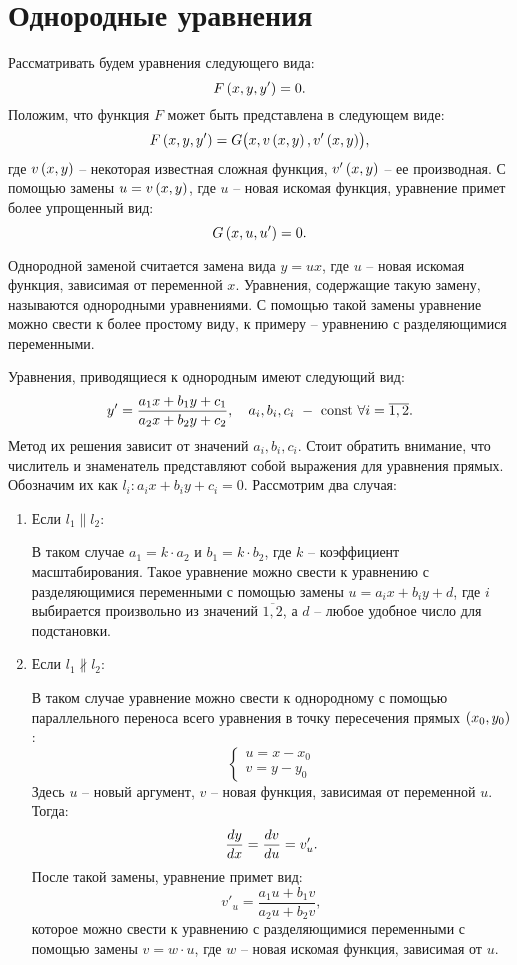 \section{Однородные уравнения}
	
	Рассматривать будем уравнения следующего вида:
	\[ F \left( x, y, y' \right) = 0. \]
	Положим, что функция $F$ может быть представлена в следующем виде:
	\[ F \left( x, y, y' \right) = G \bigl( x, v\left( x, y \right), v'\left( x, y \right) \bigr), \]
	где $v \left( x, y \right)$ -- некоторая известная сложная функция, $v' \left( x, y \right)$ -- ее производная. С помощью замены $u = v \left( x, y \right)$, где $u$ -- новая искомая функция, уравнение примет более упрощенный вид:
	\[ G \left( x, u, u' \right) = 0. \]

	Однородной заменой считается замена вида $y = ux$, где $u$ -- новая искомая функция, зависимая от переменной $x$. Уравнения, содержащие такую замену, называются однородными уравнениями. С помощью такой замены уравнение можно свести к более простому виду, к примеру -- уравнению с разделяющимися переменными.

	Уравнения, приводящиеся к однородным имеют следующий вид:
	\[ y' = \frac{a_1 x + b_1 y + c_1}{a_2 x + b_2 y + c_2}, \quad a_i, b_i, c_i ~ - ~ \mathrm{const} ~ \forall i = \overline{1, 2}. \]
	Метод их решения зависит от значений $a_i, b_i, c_i$. Стоит обратить внимание, что числитель и знаменатель представляют собой выражения для уравнения прямых. Обозначим их как $l_i: a_i x + b_i y + c_i = 0$. Рассмотрим два случая:

	\begin{enumerate}
		\item Если $l_1 \parallel l_2$:

			В таком случае $a_1 = k \cdot a_2$ и $b_1 = k \cdot b_2$, где $k$ -- коэффициент масштабирования. Такое уравнение можно свести к уравнению с разделяющимися переменными с помощью замены $u = a_i x + b_i y + d$, где $i$ выбирается произвольно из значений $\overline{1, 2}$, а $d$ -- любое удобное число для подстановки.

		\item Если $l_1 \nparallel l_2$:

			В таком случае уравнение можно свести к однородному с помощью параллельного переноса всего уравнения в точку пересечения прямых $\left( x_0, y_0 \right)$:
			\[ \left\lbrace \begin{split} u = x - x_0 \\ v = y - y_0 \end{split} \right. \]
			Здесь $u$ -- новый аргумент, $v$ -- новая функция, зависимая от переменной $u$. Тогда:
			\[ \dfrac{d y}{d x} = \dfrac{d v}{d u} = v'_u. \]
			После такой замены, уравнение примет вид:
			\[ v'_u = \frac{a_1 u + b_1 v}{a_2 u + b_2 v}, \]
			которое можно свести к уравнению с разделяющимися переменными с помощью замены $v = w \cdot u$, где $w$ -- новая искомая функция, зависимая от $u$.

	\end{enumerate}

